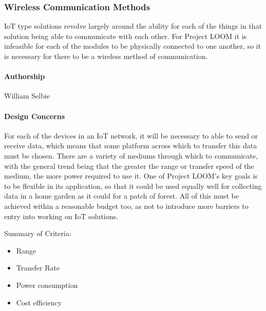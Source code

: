 \documentclass[onecolumn, draftclsnofoot,10pt, compsoc]{IEEEtran}
\begin{document}
\subsubsection{Wireless Communication Methods}
    IoT type solutions revolve largely around the ability for each of the things in that solution being able to communicate with each other. For Project LOOM it is infeasible for each of the modules to be physically connected to one another, so it is necessary for there to be a wireless method of communication. 

\paragraph{Authorship}
    William Selbie

\paragraph{Design Concerns}
    For each of the devices in an IoT network, it will be necessary to able to send or receive data, which means that some platform across which to transfer this data must be chosen. There are a variety of mediums through which to communicate, with the general trend being that the greater the range or transfer speed of the medium, the more power required to use it. One of Project LOOM's key goals is to be flexible in its application, so that it could be used equally well for collecting data in a home garden as it could for a patch of forest. All of this must be achieved within a reasonable budget too, as not to introduce more barriers to entry into working on IoT solutions. 

    Summary of Criteria:
    \begin{itemize}[noitemsep,topsep=-10pt]
        \item Range
        \item Transfer Rate
        \item Power consumption
        \item Cost efficiency
    \end{itemize}
\end{document}

